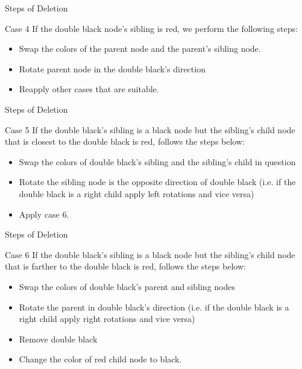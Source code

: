 \documentclass{beamer}
\begin{document}
\begin{frame}{Steps of Deletion}
    \begin{block}{Case 4}
        If the double black node's sibling is red, we perform the following steps:
        \vspace{0.3cm}
        \begin{itemize}
            \item Swap the colors of the parent node and the parent's sibling       node.
            \item Rotate parent node in the double black's direction
            \item Reapply other cases that are suitable.
        \end{itemize}
    \end{block}
\end{frame}

\begin{frame}{Steps of Deletion}
    \begin{block}{Case 5}
        If the double black's sibling is a black node but the sibling's child node that is closest to the double black is red, follows the steps below:
        \vspace{0.3cm}
        \begin{itemize}
            \item Swap the colors of double black's sibling and the sibling's child in          question
            \item Rotate the sibling node is the opposite direction of double black (i.e. if    the double black is a right child apply left rotations and vice versa)
            \item Apply case 6.
        \end{itemize}
    \end{block}
\end{frame}

\begin{frame}{Steps of Deletion}
    \begin{block}{Case 6}
        If the double black's sibling is a black node but the sibling's child node that is farther to the double black is red, follows the steps below:
        \vspace{0.3cm}
        \begin{itemize}
            \item Swap the colors of double black's parent and sibling nodes
            \item Rotate the parent in double black's direction (i.e. if the double black is    a right    child apply right rotations and vice versa)
            \item Remove double black
            \item Change the color of red child node to black.
        \end{itemize}
    \end{block}
\end{frame}
\end{document}

